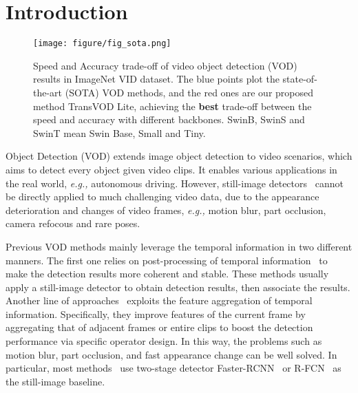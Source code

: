 \documentclass[10pt,journal,compsoc]{IEEEtran}
\begin{document}
\IEEEpeerreviewmaketitle


\section{Introduction}


\begin{figure}[t]
    \centering
    \texttt{[image: figure/fig\_sota.png]} 
    \caption{\small Speed and Accuracy trade-off of video object detection (VOD) results in ImageNet VID dataset. The blue points plot the state-of-the-art (SOTA) VOD methods, and the red ones are our proposed method TransVOD Lite, achieving the \textbf{best} trade-off between the speed and accuracy with different backbones. SwinB, SwinS and SwinT mean Swin Base, Small and Tiny. }
     \label{fig:teaser_speed_acc}
     \vspace{-5mm}
\end{figure}


 Object Detection (VOD) extends image object detection to video scenarios, which aims to detect every object given video clips. 
It enables various applications in the real world, \emph{e.g.,} autonomous driving. However, still-image detectors~\cite{ren2016faster,dai16rfcn,FocalLoss,tian2019fcos} cannot be directly applied to much challenging video data, due to the appearance deterioration and changes of video frames, \emph{e.g.,} motion blur, part occlusion, camera refocous and rare poses.

Previous VOD methods mainly leverage the temporal information in two different manners. The first one relies on post-processing of temporal information~\cite{han2016seq,kang2017t,belhassen2019improving,sabater2020robust} to make the detection results more coherent and stable. These methods usually apply a still-image detector to obtain detection results, then associate the results. Another line of approaches~\cite{yao2020video,jiang2020learning,han2020mining,han2020exploiting,lin2020dual,he2020temporal,chen2018optimizing,chen2020memory,sun2021mamba} exploits the feature aggregation of temporal information. Specifically, they improve features of the current frame by aggregating that of adjacent frames or entire clips to boost the detection performance via specific operator design. In this way, the problems such as motion blur, part occlusion, and fast appearance change can be well solved. In particular, most methods~\cite{chen2018optimizing,chen2020memory,sun2021mamba,guo2019progressive} use two-stage detector Faster-RCNN~\cite{ren2016faster} or R-FCN~\cite{dai16rfcn} as the still-image baseline.  
\end{document}
